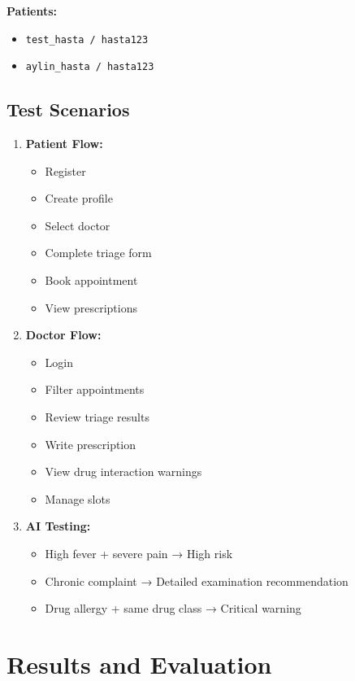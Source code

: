 \documentclass[12pt,a4paper]{article}
\begin{document}
\textbf{Patients:}
\begin{itemize}
    \item \texttt{test\_hasta / hasta123}
    \item \texttt{aylin\_hasta / hasta123}
\end{itemize}

\subsection{Test Scenarios}
\begin{enumerate}
    \item \textbf{Patient Flow:}
    \begin{itemize}
        \item Register
        \item Create profile
        \item Select doctor
        \item Complete triage form
        \item Book appointment
        \item View prescriptions
    \end{itemize}
    
    \item \textbf{Doctor Flow:}
    \begin{itemize}
        \item Login
        \item Filter appointments
        \item Review triage results
        \item Write prescription
        \item View drug interaction warnings
        \item Manage slots
    \end{itemize}
    
    \item \textbf{AI Testing:}
    \begin{itemize}
        \item High fever + severe pain → High risk
        \item Chronic complaint → Detailed examination recommendation
        \item Drug allergy + same drug class → Critical warning
    \end{itemize}
\end{enumerate}

\section{Results and Evaluation}
\end{document}
